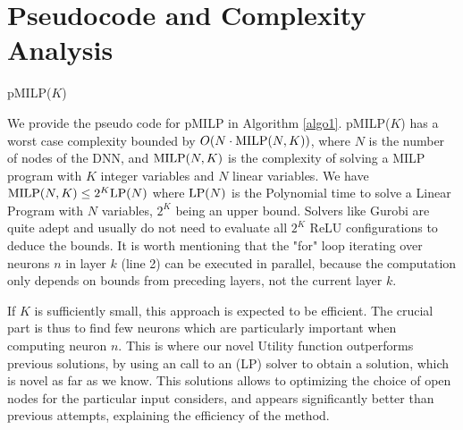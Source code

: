{\color{blue}

\section{Pseudocode and Complexity Analysis}	


\begin{algorithm}[h!]
	\caption{pMILP($K$)}
	\label{algo1}
	
	
\end{algorithm}	


We provide the pseudo code for pMILP in Algorithm \ref{algo1}.
pMILP($K$) has a worst case complexity bounded by $O(N \cdot {\textrm{MILP}}(N,K))$, 
where $N$ is the number of nodes of the DNN, and ${\textrm{MILP}}(N,K)$ is the complexity of solving a MILP program with $K$ integer variables and $N$ linear variables.
We have ${\textrm{MILP}}(N,K) \leq 2^K {\textrm{LP}}(N)$ where ${\textrm{LP}}(N)$ is the Polynomial time to solve a Linear Program with $N$ variables, $2^K$ being an upper bound. Solvers like Gurobi are quite adept and usually do not need to evaluate all $2^K$ ReLU configurations to deduce the bounds.
It is worth mentioning that the "for" loop iterating over neurons $n$ in layer $k$ (line 2) can be executed in parallel, because the computation only depends on bounds from preceding layers, not the current layer $k$. 


If $K$ is sufficiently small, 
this approach is expected to be efficient. 
The crucial part is thus to find few neurons which are particularly important when computing neuron $n$. This is where our novel Utility function outperforms previous solutions, by using an call to an (LP) solver to obtain a solution, which is novel as far as we know. This solutions allows to optimizing the choice of open nodes for the particular input considers, and appears significantly better than previous attempts, explaining the efficiency of the method.

}
